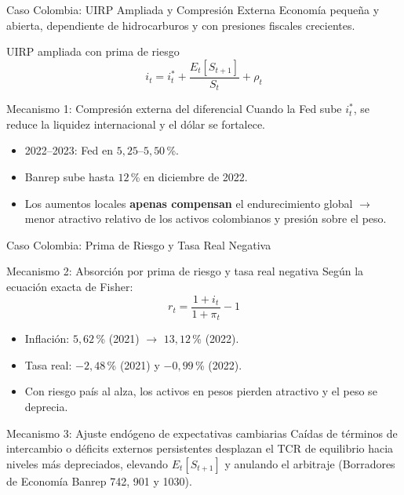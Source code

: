 \documentclass[10pt,professionalfonts,aspectratio=169]{beamer}
\begin{document}
\begin{frame}{Caso Colombia: UIRP Ampliada y Compresión Externa}
    Economía pequeña y abierta, dependiente de hidrocarburos y con presiones fiscales crecientes.

    \begin{block}{UIRP ampliada con prima de riesgo}
        \[
            i_t = i_t^* + \frac{E_t[S_{t+1}]}{S_t} + \rho_t
        \]
    \end{block}

    \begin{block}{Mecanismo 1: Compresión externa del diferencial}
        Cuando la Fed sube $i_t^*$, se reduce la liquidez internacional y el dólar se fortalece.
        \begin{itemize}
            \item 2022--2023: Fed en $5{,}25$--$5{,}50$\,\%.
            \item Banrep sube hasta $12$\,\% en diciembre de 2022.
            \item Los aumentos locales \textbf{apenas compensan} el endurecimiento global $\to$ menor atractivo relativo de los activos colombianos y presión sobre el peso.
        \end{itemize}
    \end{block}
\end{frame}

\begin{frame}{Caso Colombia: Prima de Riesgo y Tasa Real Negativa}
    \begin{block}{Mecanismo 2: Absorción por prima de riesgo y tasa real negativa}
        Según la ecuación exacta de Fisher:
        \[
            r_t = \frac{1 + i_t}{1 + \pi_t} - 1
        \]
        \begin{itemize}
            \item Inflación: $5{,}62$\,\% (2021) $\to$ $13{,}12$\,\% (2022).
            \item Tasa real: $-2{,}48$\,\% (2021) y $-0{,}99$\,\% (2022).
            \item Con riesgo país al alza, los activos en pesos pierden atractivo y el peso se deprecia.
        \end{itemize}
    \end{block}

    \begin{block}{Mecanismo 3: Ajuste endógeno de expectativas cambiarias}
        Caídas de términos de intercambio o déficits externos persistentes desplazan el TCR de equilibrio hacia niveles más depreciados, elevando $E_t[S_{t+1}]$ y anulando el arbitraje (Borradores de Economía Banrep 742, 901 y 1030).
    \end{block}
\end{frame}
\end{document}
